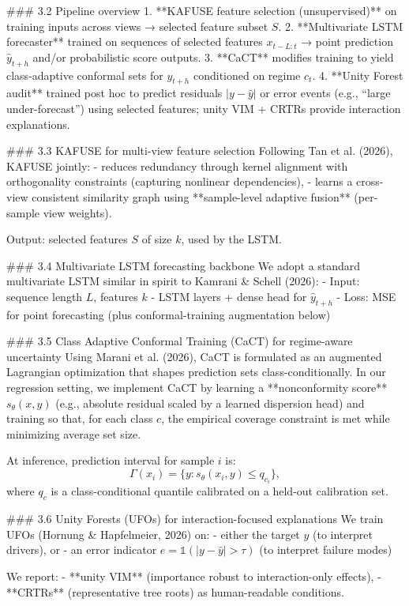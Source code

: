 ### 3.2 Pipeline overview  
1. **KAFUSE feature selection (unsupervised)** on training inputs across views → selected feature subset \(S\).  
2. **Multivariate LSTM forecaster** trained on sequences of selected features \(x_{t-L:t}\) → point prediction \(\hat{y}_{t+h}\) and/or probabilistic score outputs.  
3. **CaCT** modifies training to yield class-adaptive conformal sets for \(y_{t+h}\) conditioned on regime \(c_t\).  
4. **Unity Forest audit** trained post hoc to predict residuals \(|y-\hat y|\) or error events (e.g., “large under-forecast”) using selected features; unity VIM + CRTRs provide interaction explanations.

### 3.3 KAFUSE for multi-view feature selection  
Following Tan et al. (2026), KAFUSE jointly:
- reduces redundancy through kernel alignment with orthogonality constraints (capturing nonlinear dependencies),
- learns a cross-view consistent similarity graph using **sample-level adaptive fusion** (per-sample view weights).

Output: selected features \(S\) of size \(k\), used by the LSTM.

### 3.4 Multivariate LSTM forecasting backbone  
We adopt a standard multivariate LSTM similar in spirit to Kamrani & Schell (2026):  
- Input: sequence length \(L\), features \(k\)  
- LSTM layers + dense head for \(\hat{y}_{t+h}\)  
- Loss: MSE for point forecasting (plus conformal-training augmentation below)

### 3.5 Class Adaptive Conformal Training (CaCT) for regime-aware uncertainty  
Using Marani et al. (2026), CaCT is formulated as an augmented Lagrangian optimization that shapes prediction sets class-conditionally. In our regression setting, we implement CaCT by learning a **nonconformity score** \(s_\theta(x,y)\) (e.g., absolute residual scaled by a learned dispersion head) and training so that, for each class \(c\), the empirical coverage constraint is met while minimizing average set size.

At inference, prediction interval for sample \(i\) is:
\[
\Gamma(x_i) = \{y: s_\theta(x_i,y)\le q_{c_i}\},
\]
where \(q_{c}\) is a class-conditional quantile calibrated on a held-out calibration set.

### 3.6 Unity Forests (UFOs) for interaction-focused explanations  
We train UFOs (Hornung & Hapfelmeier, 2026) on:
- either the target \(y\) (to interpret drivers), or
- an error indicator \(e=\mathbb{1}(|y-\hat y|>\tau)\) (to interpret failure modes)

We report:
- **unity VIM** (importance robust to interaction-only effects),
- **CRTRs** (representative tree roots) as human-readable conditions.

